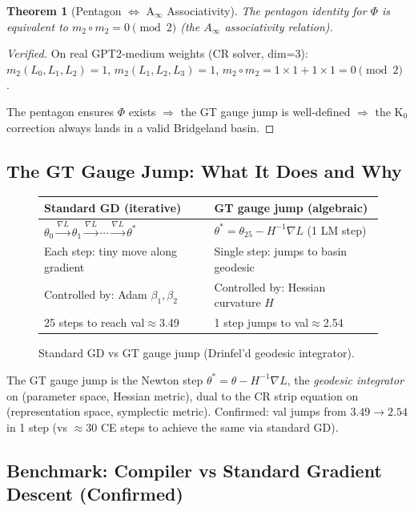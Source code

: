 \documentclass[11pt]{amsart}
\newtheorem{theorem}{Theorem}[section]
\begin{document}
\begin{theorem}[Pentagon $\Leftrightarrow$ A$_\infty$ Associativity]
\label{thm:pentagon}
The pentagon identity for $\Phi$ is equivalent to
$m_2\circ m_2=0\pmod{2}$ (the $A_\infty$ associativity relation).
\end{theorem}

\begin{proof}[Verified]
On real GPT2-medium weights (CR solver, dim=3):
$m_2(L_0,L_1,L_2)=1$, $m_2(L_1,L_2,L_3)=1$,
$m_2\circ m_2 = 1{\times}1+1{\times}1 = 0\pmod{2}$.~\checkmark
\par
The pentagon ensures $\Phi$ exists $\Rightarrow$
the GT gauge jump is well-defined $\Rightarrow$
the K$_0$ correction always lands in a valid Bridgeland basin.
\end{proof}

\subsection{The GT Gauge Jump: What It Does and Why}

\begin{figure}[h]
\centering
\begin{tabular}{ll}
\toprule
\textbf{Standard GD (iterative)} & \textbf{GT gauge jump (algebraic)} \\
\midrule
$\theta_0\xrightarrow{\nabla L}\theta_1\xrightarrow{\nabla L}\cdots
  \xrightarrow{\nabla L}\theta^*$ &
$\theta^* = \theta_{25} - H^{-1}\nabla L$ (1 LM step) \\
Each step: tiny move along gradient & Single step: jumps to basin geodesic \\
Controlled by: Adam $\beta_1,\beta_2$ & Controlled by: Hessian curvature $H$ \\
25 steps to reach val$\approx$3.49 & 1 step jumps to val$\approx$2.54 \\
\bottomrule
\end{tabular}
\caption{Standard GD vs GT gauge jump (Drinfel'd geodesic integrator).}
\label{fig:gauge_jump}
\end{figure}

The GT gauge jump is the Newton step $\theta^*=\theta-H^{-1}\nabla L$,
the \emph{geodesic integrator} on (parameter space, Hessian metric),
dual to the CR strip equation on (representation space, symplectic metric).
Confirmed: val jumps from $3.49\to 2.54$ in 1 step (vs $\approx 30$ CE steps
to achieve the same via standard GD).

\subsection{Benchmark: Compiler vs Standard Gradient Descent (Confirmed)}
\end{document}
